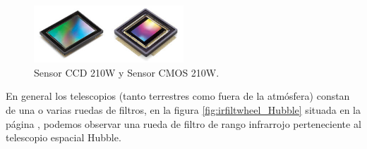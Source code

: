 	\begin{figure}
		\centering
		\includegraphics[width=0.5\textwidth]{images/ccd_and_cmos_sensors_210w.png}
		\caption{\label{fig:SensorCCD}Sensor CCD 210W y Sensor CMOS 210W.}
	\end{figure}
	En general los telescopios (tanto terrestres como fuera de la atmósfera) constan de una o varias ruedas de filtros, en la figura \ref{fig:irfiltwheel_Hubble} situada en la página \pageref{fig:irfiltwheel_Hubble}, podemos observar una rueda de filtro de rango infrarrojo perteneciente al telescopio espacial Hubble.

